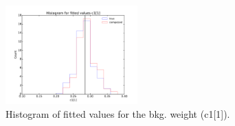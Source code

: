 \documentclass[a4paper]{jpconf}
\begin{document}
\begin{figure}[h]
\begin{minipage}{11pc}
\includegraphics[width=12pc]{c1c2_train_mlp_c2_hist.pdf}
\caption{\label{fig:hist2}  Histogram of fitted values for the bkg. weight (c1[1]).}
\end{minipage}
\end{figure}
\end{document}
